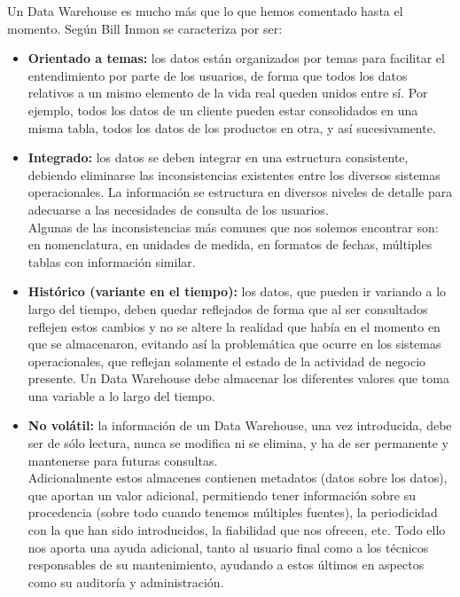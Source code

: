 \documentclass[%
 reprint,
 amsmath,amssymb,
 aps,
]{revtex4-1}
\begin{document}
Un Data Warehouse es mucho más que lo que hemos comentado hasta el momento. Según Bill Inmon se caracteriza por ser:
\begin{itemize}
	\item \textbf{Orientado a temas:}  los datos están organizados por temas para facilitar el entendimiento por parte de los usuarios, de forma que todos los datos relativos a un mismo elemento de la vida real queden unidos entre sí. Por ejemplo, todos los datos de un cliente pueden estar consolidados en una misma tabla, todos los datos de los productos en otra, y así sucesivamente.
	\item \textbf{Integrado:}  los datos se deben integrar en una estructura consistente, debiendo eliminarse las inconsistencias existentes entre los diversos sistemas operacionales. La información se estructura en diversos niveles de detalle para adecuarse a las necesidades de consulta de los usuarios. \\Algunas de las inconsistencias más comunes que nos solemos encontrar son: en nomenclatura, en unidades de medida, en formatos de fechas, múltiples
	tablas con información similar.
	\item \textbf{Histórico (variante en el tiempo):}   los datos, que pueden ir variando a lo largo del tiempo, deben quedar reflejados de forma que al ser consultados reflejen estos cambios y no se altere la realidad que había en el momento en que se almacenaron, evitando así la problemática que ocurre en los sistemas operacionales, que reflejan solamente el estado de la actividad de negocio presente. Un Data Warehouse debe almacenar los diferentes valores que
toma una variable a lo largo del tiempo. 
	\item \textbf{No volátil:}   la información de un Data Warehouse, una vez introducida, debe ser de sólo lectura, nunca se modifica ni se elimina, y ha de ser permanente y  mantenerse para futuras consultas. \\

Adicionalmente estos almacenes contienen metadatos (datos sobre los datos), que aportan un valor adicional, permitiendo tener información sobre su procedencia (sobre todo cuando tenemos múltiples fuentes), la periodicidad con la que han sido introducidos, la fiabilidad que nos ofrecen, etc. Todo ello nos aporta una ayuda adicional, tanto al usuario final como a los técnicos responsables de su mantenimiento, ayudando a estos últimos en aspectos como su auditoría y administración. \\


\end{itemize}
\end{document}

